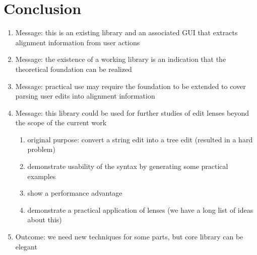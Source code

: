 \section{Conclusion}
\label{sec:impl-conclusion}
\begin{enumerate}
    \item Message: this is an existing library and an associated GUI that extracts alignment information from user actions
    \item Message: the existence of a working library is an indication that the theoretical foundation can be realized
    \item Message: practical use may require the foundation to be extended to cover parsing user edits into alignment information
    \item Message: this library could be used for further studies of edit lenses beyond the scope of the current work
        \begin{enumerate}
            \item original purpose: convert a string edit into a tree edit (resulted in a hard problem)
            \item demonstrate usability of the syntax by generating some practical examples
            \item show a performance advantage
            \item demonstrate a practical application of lenses (we have a long list of ideas about this)
        \end{enumerate}
    \item Outcome: we need new techniques for some parts, but core library can be elegant
\end{enumerate}
